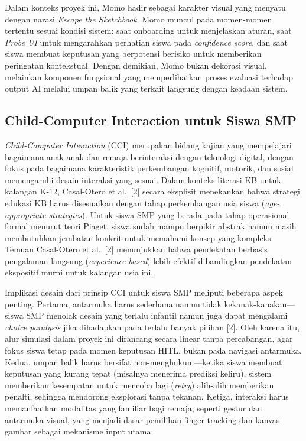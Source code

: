 \documentclass[12pt,oneside]{report}
\begin{document}
Dalam konteks proyek ini, Momo hadir sebagai karakter visual yang menyatu dengan narasi \textit{Escape the Sketchbook}. Momo muncul pada momen-momen tertentu sesuai kondisi sistem: saat onboarding untuk menjelaskan aturan, saat \textit{Probe UI} untuk mengarahkan perhatian siswa pada \textit{confidence score}, dan saat siswa membuat keputusan yang berpotensi berisiko untuk memberikan peringatan kontekstual. Dengan demikian, Momo bukan dekorasi visual, melainkan komponen fungsional yang memperlihatkan proses evaluasi terhadap output AI melalui umpan balik yang terkait langsung dengan keadaan sistem.

\subsection{Child-Computer Interaction untuk Siswa SMP}
\label{subsec:cci-smp}

\textit{Child-Computer Interaction} (CCI) merupakan bidang kajian yang mempelajari bagaimana anak-anak dan remaja berinteraksi dengan teknologi digital, dengan fokus pada bagaimana karakteristik perkembangan kognitif, motorik, dan sosial memengaruhi desain interaksi yang sesuai. Dalam konteks literasi KB untuk kalangan K-12, Casal-Otero et al.\ [2] secara eksplisit menekankan bahwa strategi edukasi KB harus disesuaikan dengan tahap perkembangan usia siswa (\textit{age-appropriate strategies}). Untuk siswa SMP yang berada pada tahap operasional formal menurut teori Piaget, siswa sudah mampu berpikir abstrak namun masih membutuhkan jembatan konkrit untuk memahami konsep yang kompleks. Temuan Casal-Otero et al.\ [2] menunjukkan bahwa pendekatan berbasis pengalaman langsung (\textit{experience-based}) lebih efektif dibandingkan pendekatan ekspositif murni untuk kalangan usia ini.

Implikasi desain dari prinsip CCI untuk siswa SMP meliputi beberapa aspek penting. Pertama, antarmuka harus sederhana namun tidak kekanak-kanakan---siswa SMP menolak desain yang terlalu infantil namun juga dapat mengalami \textit{choice paralysis} jika dihadapkan pada terlalu banyak pilihan [2]. Oleh karena itu, alur simulasi dalam proyek ini dirancang secara linear tanpa percabangan, agar fokus siswa tetap pada momen keputusan HITL, bukan pada navigasi antarmuka. Kedua, umpan balik harus bersifat non-menghukum---ketika siswa membuat keputusan yang kurang tepat (misalnya menerima prediksi keliru), sistem memberikan kesempatan untuk mencoba lagi (\textit{retry}) alih-alih memberikan penalti, sehingga mendorong eksplorasi tanpa tekanan. Ketiga, interaksi harus memanfaatkan modalitas yang familiar bagi remaja, seperti gestur dan antarmuka visual, yang menjadi dasar pemilihan finger tracking dan kanvas gambar sebagai mekanisme input utama.
\end{document}
